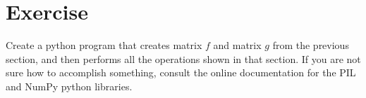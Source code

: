\section{Exercise}

Create a python program that creates matrix $f$ and matrix $g$ from the previous section, and then performs all the operations shown in that section. If you are not sure how to accomplish something, consult the online documentation for the PIL and NumPy python libraries. 
